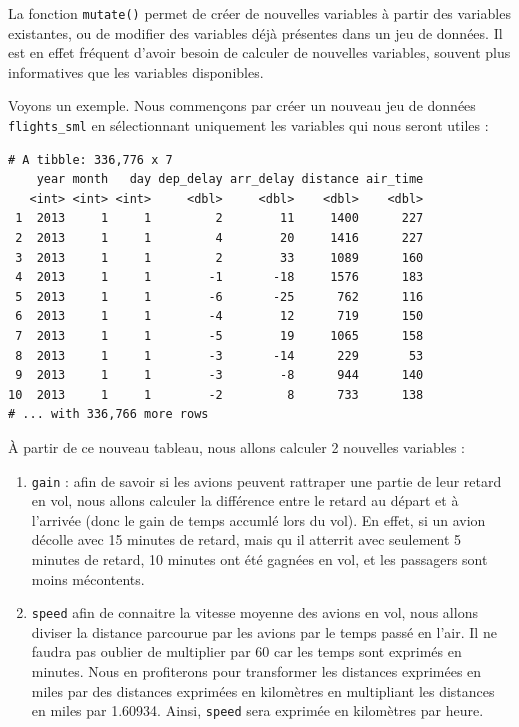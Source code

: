 \documentclass[a4paperpaper,]{article}
\newenvironment{Shaded}{\begin{snugshade}}{\end{snugshade}}
\newcommand{\KeywordTok}[1]{\textcolor[rgb]{0.12,0.11,0.11}{\textbf{#1}}}
\newcommand{\NormalTok}[1]{\textcolor[rgb]{0.12,0.11,0.11}{#1}}
\newcommand{\OperatorTok}[1]{\textcolor[rgb]{0.12,0.11,0.11}{#1}}
\newcommand{\StringTok}[1]{\textcolor[rgb]{0.75,0.01,0.01}{#1}}
\providecommand{\tightlist}{%
  \setlength{\itemsep}{0pt}\setlength{\parskip}{0pt}}
\theoremstyle{definition}
\theoremstyle{definition}
\theoremstyle{definition}
\theoremstyle{remark}
\begin{document}
La fonction \texttt{mutate()} permet de créer de nouvelles variables à
partir des variables existantes, ou de modifier des variables déjà
présentes dans un jeu de données. Il est en effet fréquent d'avoir
besoin de calculer de nouvelles variables, souvent plus informatives que
les variables disponibles.

Voyons un exemple. Nous commençons par créer un nouveau jeu de données
\texttt{flights\_sml} en sélectionnant uniquement les variables qui nous
seront utiles :

\begin{Shaded}
\end{Shaded}

\begin{verbatim}
# A tibble: 336,776 x 7
    year month   day dep_delay arr_delay distance air_time
   <int> <int> <int>     <dbl>     <dbl>    <dbl>    <dbl>
 1  2013     1     1         2        11     1400      227
 2  2013     1     1         4        20     1416      227
 3  2013     1     1         2        33     1089      160
 4  2013     1     1        -1       -18     1576      183
 5  2013     1     1        -6       -25      762      116
 6  2013     1     1        -4        12      719      150
 7  2013     1     1        -5        19     1065      158
 8  2013     1     1        -3       -14      229       53
 9  2013     1     1        -3        -8      944      140
10  2013     1     1        -2         8      733      138
# ... with 336,766 more rows
\end{verbatim}

À partir de ce nouveau tableau, nous allons calculer 2 nouvelles
variables :

\begin{enumerate}
\def\labelenumi{\arabic{enumi}.}
\tightlist
\item
  \texttt{gain} : afin de savoir si les avions peuvent rattraper une
  partie de leur retard en vol, nous allons calculer la différence entre
  le retard au départ et à l'arrivée (donc le gain de temps accumlé lors
  du vol). En effet, si un avion décolle avec 15 minutes de retard, mais
  qu il atterrit avec seulement 5 minutes de retard, 10 minutes ont été
  gagnées en vol, et les passagers sont moins mécontents.
\item
  \texttt{speed} afin de connaitre la vitesse moyenne des avions en vol,
  nous allons diviser la distance parcourue par les avions par le temps
  passé en l'air. Il ne faudra pas oublier de multiplier par 60 car les
  temps sont exprimés en minutes. Nous en profiterons pour transformer
  les distances exprimées en miles par des distances exprimées en
  kilomètres en multipliant les distances en miles par 1.60934. Ainsi,
  \texttt{speed} sera exprimée en kilomètres par heure.
\end{enumerate}
\end{document}
